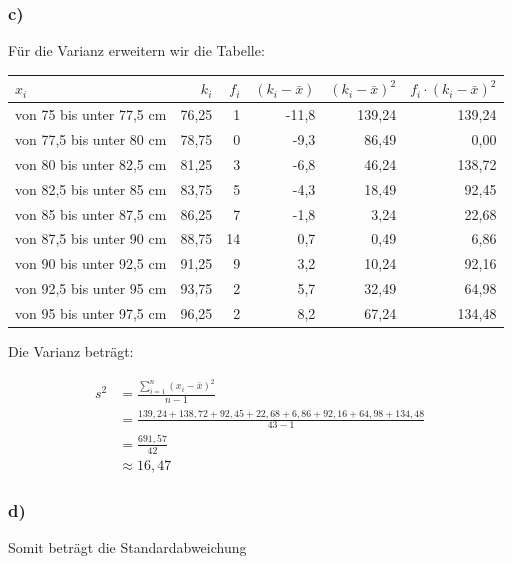 \documentclass[
  11pt,
  ngerman,
  a4paper,
]{report}
\begin{document}
\hypertarget{c-5}{%
\subsubsection{c)}\label{c-5}}

Für die Varianz erweitern wir die Tabelle:

\begin{table}[H]
\centering
\begin{tabular}{lrrrrr}
\toprule
\textbf{$x_i$} & \textbf{$k_i$} & \textbf{$f_i$} & \textbf{$(k_i - \bar{x})$} & \textbf{$(k_i - \bar{x})^2$} & \textbf{$f_i \cdot (k_i - \bar{x})^2$}\\
\midrule
von 75 bis unter 77,5 cm & 76,25 & 1 & -11,8 & 139,24 & 139,24\\
von 77,5 bis unter 80 cm & 78,75 & 0 & -9,3 & 86,49 & 0,00\\
von 80 bis unter 82,5 cm & 81,25 & 3 & -6,8 & 46,24 & 138,72\\
von 82,5 bis unter 85 cm & 83,75 & 5 & -4,3 & 18,49 & 92,45\\
von 85 bis unter 87,5 cm & 86,25 & 7 & -1,8 & 3,24 & 22,68\\
von 87,5 bis unter 90 cm & 88,75 & 14 & 0,7 & 0,49 & 6,86\\
von 90 bis unter 92,5 cm & 91,25 & 9 & 3,2 & 10,24 & 92,16\\
von 92,5 bis unter 95 cm & 93,75 & 2 & 5,7 & 32,49 & 64,98\\
von 95 bis unter 97,5 cm & 96,25 & 2 & 8,2 & 67,24 & 134,48\\
\bottomrule
\end{tabular}
\end{table}

Die Varianz beträgt:

\[\begin{aligned}
  s^2&=\frac{\sum\limits_{i=1}^{n}(x_{i}-\bar{x})^2}{n-1} \\
     &=\frac{139{,}24+138{,}72+ 92{,}45+ 22{,}68+  6{,}86+ 92{,}16+ 64{,}98+134{,}48}{43-1}\\
     &=\frac{691{,}57}{42}\\
     &\approx{16{,}47}
\end{aligned}\]

\hypertarget{d}{%
\subsubsection{d)}\label{d}}

Somit beträgt die Standardabweichung
\end{document}
